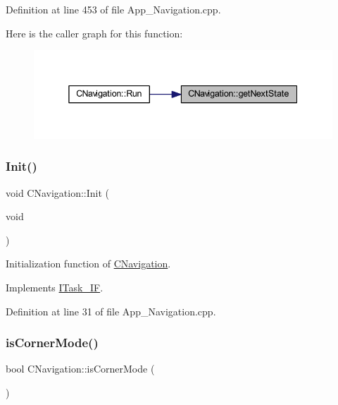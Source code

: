 Definition at line 453 of file App\+\_\+\+Navigation.\+cpp.

Here is the caller graph for this function\+:
\nopagebreak
\begin{figure}[H]
\begin{center}
\leavevmode
\includegraphics[width=338pt]{class_c_navigation_afef253f37646558a755d956ecf2fc6e9_icgraph}
\end{center}
\end{figure}
\mbox{\label{class_c_navigation_a86a0756663ccf76e9c474764b8f7a04f}} 
\subsubsection{\texorpdfstring{Init()}{Init()}}
{\footnotesize\ttfamily void C\+Navigation\+::\+Init (\begin{DoxyParamCaption}\item[{void}]{ }\end{DoxyParamCaption})\hspace{0.3cm}{\ttfamily [virtual]}}



Initialization function of \mbox{\hyperlink{class_c_navigation}{C\+Navigation}}. 



Implements \mbox{\hyperlink{class_i_task___i_f_a28f608bdb9b19658403f7b9b7421968d}{I\+Task\+\_\+\+IF}}.



Definition at line 31 of file App\+\_\+\+Navigation.\+cpp.

\mbox{\label{class_c_navigation_aa984fc062deefed13a85d866d997de73}} 
\subsubsection{\texorpdfstring{isCornerMode()}{isCornerMode()}}
{\footnotesize\ttfamily bool C\+Navigation\+::is\+Corner\+Mode (\begin{DoxyParamCaption}{ }\end{DoxyParamCaption})}




